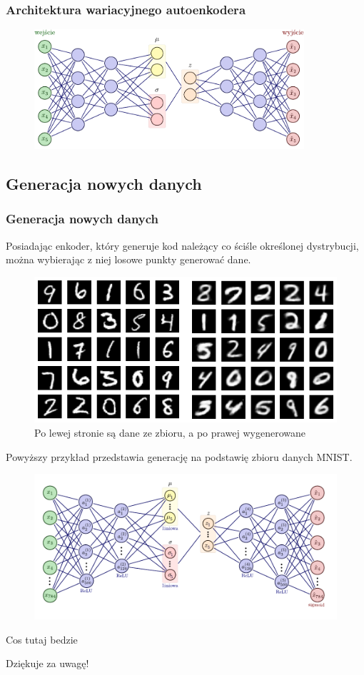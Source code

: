 \documentclass{beamer}
\begin{document}
	\begin{frame}
		\frametitle{Architektura wariacyjnego autoenkodera}
		\begin{figure}
			\centering\includegraphics[width=10cm]{tikzvae.pdf}
		\end{figure}
	\end{frame}

	\begin{frame}
		\subsection{Generacja nowych danych}
		\frametitle{Generacja nowych danych}
		Posiadając enkoder, który generuje kod należący co ściśle określonej dystrybucji, można wybierając z niej losowe punkty generować dane. 
		
		\begin{figure}
			\centering\includegraphics{vaegeneracja.png} 
			\caption{Po lewej stronie są dane ze zbioru, a po prawej wygenerowane}
		\end{figure}
	
	Powyższy przykład przedstawia generację na podstawię zbioru danych MNIST.
		
	\end{frame}

	\begin{frame}
		\vspace{-1cm}
		\begin{figure}
			\centering\includegraphics[width=12cm]{prawdziwyvae.pdf}
		\end{figure}
			Cos tutaj bedzie
	\end{frame}

	\begin{frame}
		\begin{center}
			\huge Dziękuje za uwagę!
		\end{center}
	\end{frame}
\end{document}
